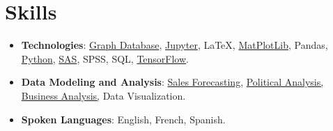\documentclass[letterpaper,11pt]{article}
\newcommand{\resumeItem}[2]{
  \item\small{
    \textbf{#1}{: #2 \vspace{-0pt}}
  }
}
\newcommand{\resumeSubItem}[2]{\resumeItem{#1}{#2}\vspace{-2pt}}
\newcommand{\resumeSubHeadingListStart}{\begin{itemize}[leftmargin=*]}
\newcommand{\resumeSubHeadingListEnd}{\end{itemize}}
\begin{document}
  \section{Skills}
    \resumeSubHeadingListStart
      \resumeSubItem{Technologies}
        {{\href{https://docs.jnapolitano.io/parts/data/graph-database/index.html}{Graph Database}}, {\href{https://docs.jnapolitano.io/parts/analysis/business-analysis/project-retail-sales-forecasting/code-base/SalesForcasting.html}{Jupyter}}, LaTeX, {\href{https://docs.jnapolitano.io/parts/analysis/business-analysis/project-retail-sales-forecasting/code-base/SalesForcasting.html}{MatPlotLib}}, Pandas, {\href{https://docs.jnapolitano.io/index.html}{Python}}, {\href{https://docs.jnapolitano.io/parts/data/experimental-design/index.html}{SAS}, SPSS, SQL, \href{https://docs.jnapolitano.io/parts/ml-ai/index.html}{TensorFlow}}.}
      \resumeSubItem{Data Modeling and Analysis}
        {\href{https://docs.jnapolitano.io/parts/analysis/business-analysis/project-retail-sales-forecasting/code-base/SalesForcasting.html}{Sales Forecasting,} {\href{https://docs.jnapolitano.io/parts/analysis/political-analysis/index.html}{Political Analysis,}} {\href{https://docs.jnapolitano.io/parts/analysis/business-analysis/index.html}{Business Analysis,}} Data Visualization.}
      \resumeSubItem{Spoken Languages}
        {English, French, Spanish.}
    \resumeSubHeadingListEnd
\end{document}

